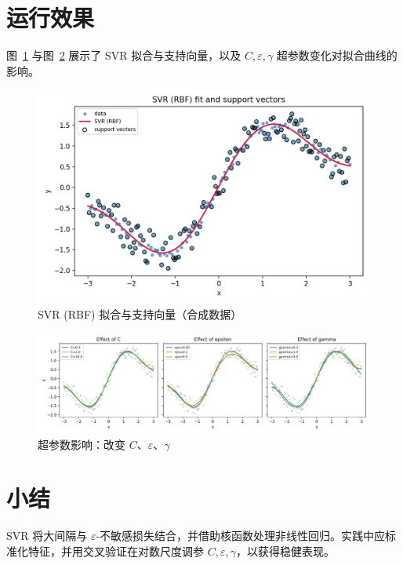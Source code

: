 \documentclass[UTF8,zihao=-4]{ctexart}
\begin{document}
\section{运行效果}
图~\ref{fig:svr_rbf_fit} 与图~\ref{fig:svr_params} 展示了 SVR 拟合与支持向量，以及 \(C,\varepsilon,\gamma\) 超参数变化对拟合曲线的影响。

\begin{figure}[H]
  \centering
  \includegraphics[width=0.85\linewidth]{svr_rbf_fit.png}
  \caption{SVR (RBF) 拟合与支持向量（合成数据）}
  \label{fig:svr_rbf_fit}
\end{figure}

\begin{figure}[H]
  \centering
  \includegraphics[width=0.95\linewidth]{svr_params_effect.png}
  \caption{超参数影响：改变 \(C\)、\(\varepsilon\)、\(\gamma\)}
  \label{fig:svr_params}
\end{figure}

\FloatBarrier %

\section{小结}
SVR 将大间隔与 \(\varepsilon\)-不敏感损失结合，并借助核函数处理非线性回归。实践中应标准化特征，并用交叉验证在对数尺度调参 \(C,\varepsilon,\gamma\)，以获得稳健表现。
\end{document}
